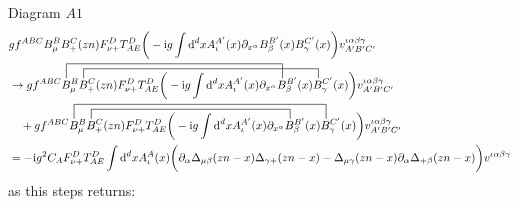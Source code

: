 Diagram $A1$
\begin{align}
	&g f^{ABC} B_\mu^B B_+^C (zn) \ft_{\nu +}^D T^D_{AE}\bigg(-\imag g \int \ddx xA_\iota^{A'}(x) \partial_{x^\alpha} B_\beta^{B'} (x) B_\gamma^{C'}(x) \bigg) v^{\iota \alpha\beta\gamma}_{A'B'C'}
	\\
	&\rightarrow
	\contraction[3ex]{g f^{ABC}}{B}{_\mu^B B_+^C (zn) \ft_{\nu +}^D T^D_{AE}\bigg(-\imag g \int \ddx xA_\iota^{A'}(x) \partial_{x^\alpha} }{B}
	\contraction[2ex]{g f^{ABC} B_\mu^B }{B}{_+^C (zn) \ft_{\nu +}^D T^D_{AE}\bigg(-\imag g \int \ddx xA_\iota^{A'}(x) \partial_{x^\alpha} B_\beta^{B'} (x) }{B}
	g f^{ABC} B_\mu^B B_+^C (zn) \ft_{\nu +}^D T^D_{AE}\bigg(-\imag g \int \ddx xA_\iota^{A'}(x) \partial_{x^\alpha} B_\beta^{B'} (x) B_\gamma^{C'}(x) \bigg) v^{\iota \alpha\beta\gamma}_{A'B'C'}
	\nl
	\contraction[2ex]{+g f^{ABC} B_\mu^B }{B}{_+^C (zn) \ft_{\nu +}^D T^D_{AE}\bigg(-\imag g \int \ddx xA_\iota^{A'}(x) \partial_{x^\alpha} }{B}
	\contraction[3ex]{+g f^{ABC} }{B}{_\mu^B B_+^C (zn) \ft_{\nu +}^D T^D_{AE}\bigg(-\imag g \int \ddx xA_\iota^{A'}(x) \partial_{x^\alpha} B_\beta^{B'} (x) }{B}
	+g f^{ABC} B_\mu^B B_+^C (zn) \ft_{\nu +}^D T^D_{AE}\bigg(-\imag g \int \ddx xA_\iota^{A'}(x) \partial_{x^\alpha} B_\beta^{B'} (x) B_\gamma^{C'}(x) \bigg) v^{\iota \alpha\beta\gamma}_{A'B'C'}
	\\
	&=
	-\imag g^2 C_A \ft_{\nu +} ^D T^D_{AE} \int \ddx x A_\iota^A(x) \bigg( \partial_\alpha\propagator_{\mu \beta}(zn-x) \propagator_{\gamma +} (zn -x) - \propagator_{\mu \gamma}(zn-x) \partial_{\alpha}\propagator_{+\beta}(zn-x) \bigg) v^{\iota\alpha\beta\gamma}
\end{align}
as this steps returns:


